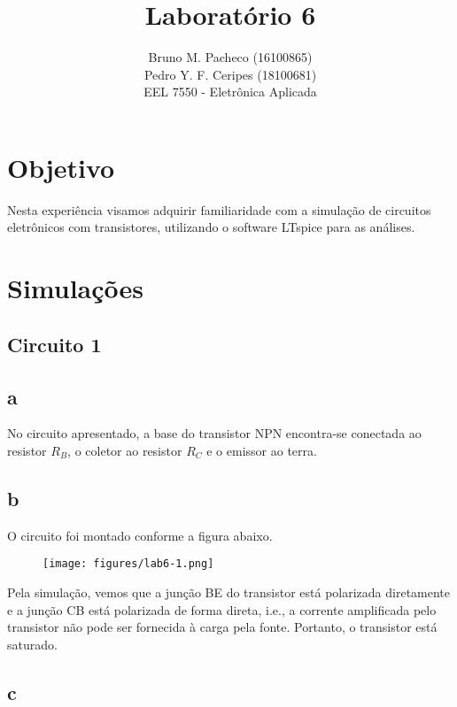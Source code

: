 \documentclass[a4paper]{report}
\begin{document}
 
\title{Laboratório 6}
\author{Bruno M. Pacheco (16100865)\\
Pedro Y. F. Ceripes (18100681) \\
EEL 7550 - Eletrônica Aplicada}

\maketitle
\section*{Objetivo}

Nesta experiência visamos adquirir familiaridade com a simulação de circuitos eletrônicos com transistores, utilizando o software LTspice para as análises.
 
\section*{Simulações}

\subsection*{Circuito 1}
\subsection*{a}

No circuito apresentado, a base do transistor NPN encontra-se conectada ao resistor $R_B$, o coletor ao resistor $R_C$ e o emissor ao terra.

\subsection*{b}

O circuito foi montado conforme a figura abaixo.

\begin{figure}[H]
    \centering
    \texttt{[image: figures/lab6-1.png]}
\end{figure}

Pela simulação, vemos que a junção BE do transistor está polarizada diretamente e a junção CB está polarizada de forma direta, i.e., a corrente amplificada pelo transistor não pode ser fornecida à carga pela fonte. Portanto, o transistor está saturado.

\subsection*{c}
\end{document}
